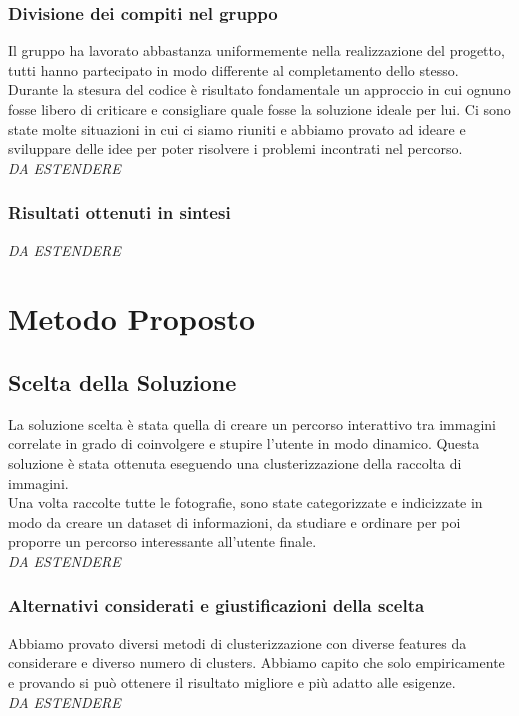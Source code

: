 \documentclass[12pt,a4paper,twoside]{article}
\begin{document}
\subsubsection*{Divisione dei compiti nel gruppo}
Il gruppo ha lavorato abbastanza uniformemente nella realizzazione del progetto, tutti hanno partecipato 
in modo differente al completamento dello stesso.\\
Durante la stesura del codice è risultato fondamentale un approccio in cui ognuno fosse libero di 
criticare e consigliare quale fosse la soluzione ideale per lui. Ci sono state molte situazioni in cui 
ci siamo riuniti e abbiamo provato ad ideare e sviluppare delle idee per poter risolvere i problemi 
incontrati nel percorso.\\
\textit{DA ESTENDERE}
\subsubsection*{Risultati ottenuti in sintesi}
\textit{DA ESTENDERE}


\newpage
\section{Metodo Proposto}

\subsection*{Scelta della Soluzione}
La soluzione scelta è stata quella di creare un percorso interattivo tra immagini correlate in 
grado di coinvolgere e stupire l'utente in modo dinamico. Questa soluzione è stata ottenuta 
eseguendo una clusterizzazione della raccolta di immagini.\\
Una volta raccolte tutte le fotografie, sono state categorizzate e indicizzate in modo da creare 
un dataset di informazioni, da studiare e ordinare per poi proporre un percorso interessante 
all'utente finale.\\
\textit{DA ESTENDERE}
\subsubsection*{Alternativi considerati e giustificazioni della scelta}
Abbiamo provato diversi metodi di clusterizzazione con diverse features da considerare e diverso 
numero di clusters. Abbiamo capito che solo empiricamente e provando si può ottenere il risultato 
migliore e più adatto alle esigenze.\\
\textit{DA ESTENDERE}
\end{document}
